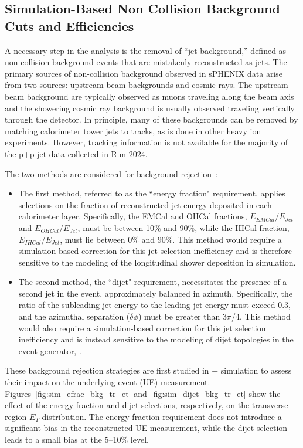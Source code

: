 \subsection{Simulation-Based Non Collision Background Cuts and Efficiencies}
\label{sec:sim_jet_background}

A necessary step in the analysis is the removal of “jet background,” defined as non-collision background events that are mistakenly reconstructed as jets. 
The primary sources of non-collision background observed in sPHENIX data arise from two sources: upstream beam backgrounds and cosmic rays. The upstream beam background are typically observed as muons traveling along the beam axis and the showering cosmic ray background is usually observed traveling vertically through the detector. 
In principle, many of these backgrounds can be removed by matching calorimeter tower jets to tracks, as is done in other heavy ion experiments. However, tracking information is not available for the majority of the p+p jet data collected in Run 2024.

The two methods are considered for background rejection~\cite{ppg09AN}:
\begin{itemize}
    \item The first method, referred to as the “energy fraction" requirement, applies selections on the fraction of reconstructed jet energy deposited in each calorimeter layer. Specifically, the EMCal and OHCal fractions, $E_{EMCal}/E_{Jet}$ and $E_{OHCal}/E_{Jet}$, must be between 10\% and 90\%, while the IHCal fraction, $E_{IHCal}/E_{Jet}$, must lie between 0\% and 90\%. This method would require a simulation-based correction for this jet selection inefficiency and is therefore sensitive to the \geant modeling of the longitudinal shower deposition in simulation.
    \item The second method, the “dijet" requirement, necessitates the presence of a second jet in the event, approximately balanced in azimuth. Specifically, the ratio of the subleading jet energy to the leading jet energy must exceed 0.3, and the azimuthal separation ($\delta\phi$) must be greater than 3$\pi$/4. This method would also require a simulation-based correction for this jet selection inefficiency and is instead sensitive to the modeling of dijet topologies in the event generator, \pythia.
\end{itemize}

These background rejection strategies are first studied in \pythia + \geant simulation to assess their impact on the underlying event (UE) measurement. 
Figures~\ref{fig:sim_efrac_bkg_tr_et} and~\ref{fig:sim_dijet_bkg_tr_et} show the effect of the energy fraction and dijet selections, respectively, on the transverse region $E_{T}$ distribution. 
The energy fraction requirement does not introduce a significant bias in the reconstructed UE measurement, while the dijet selection leads to a small bias at the 5--10\% level.


